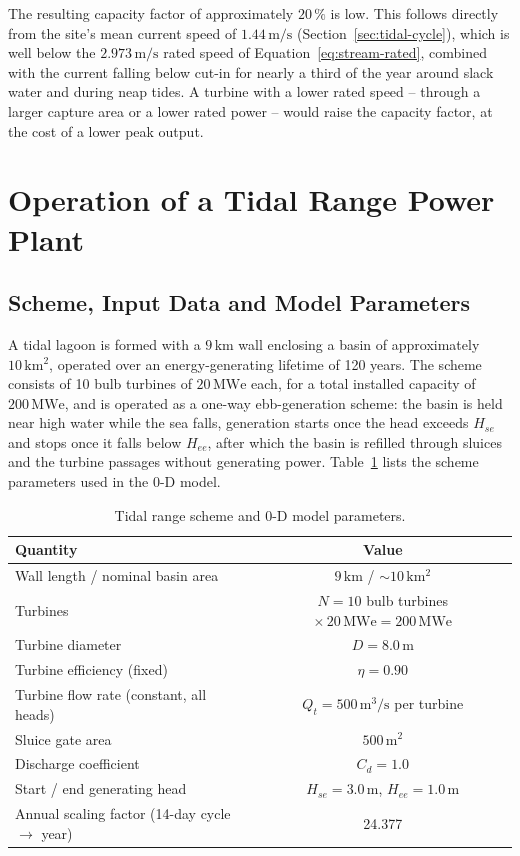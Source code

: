 The resulting capacity factor of approximately $20\,\%$ is low. This follows directly from the site's mean current speed of $1.44\,\mathrm{m/s}$ (Section~\ref{sec:tidal-cycle}), which is well below the $2.973\,\mathrm{m/s}$ rated speed of Equation~\eqref{eq:stream-rated}, combined with the current falling below cut-in for nearly a third of the year around slack water and during neap tides. A turbine with a lower rated speed -- through a larger capture area or a lower rated power -- would raise the capacity factor, at the cost of a lower peak output.

\section{Operation of a Tidal Range Power Plant}
\label{sec:tidal-range}

\subsection{Scheme, Input Data and Model Parameters}
\label{sec:range-inputs}
A tidal lagoon is formed with a $9\,\mathrm{km}$ wall enclosing a basin of approximately $10\,\mathrm{km^2}$, operated over an energy-generating lifetime of 120 years. The scheme consists of 10 bulb turbines of $20\,\mathrm{MWe}$ each, for a total installed capacity of $200\,\mathrm{MWe}$, and is operated as a one-way ebb-generation scheme: the basin is held near high water while the sea falls, generation starts once the head exceeds $H_{se}$ and stops once it falls below $H_{ee}$, after which the basin is refilled through sluices and the turbine passages without generating power. Table~\ref{tab:range-params} lists the scheme parameters used in the 0-D model.

\begin{table}[H]
    \centering
    \caption{Tidal range scheme and 0-D model parameters.}
    \label{tab:range-params}
    \begin{tabular}{lc}
        \hline
        Quantity & Value \\
        \hline
        Wall length / nominal basin area & $9\,\mathrm{km}$ / $\sim 10\,\mathrm{km^2}$ \\
        Turbines & $N=10$ bulb turbines $\times\, 20\,\mathrm{MWe} = 200\,\mathrm{MWe}$ \\
        Turbine diameter & $D = 8.0\,\mathrm{m}$ \\
        Turbine efficiency (fixed) & $\eta = 0.90$ \\
        Turbine flow rate (constant, all heads) & $Q_t = 500\,\mathrm{m^3/s}$ per turbine \\
        Sluice gate area & $500\,\mathrm{m^2}$ \\
        Discharge coefficient & $C_d = 1.0$ \\
        Start / end generating head & $H_{se}=3.0\,\mathrm{m}$, $H_{ee}=1.0\,\mathrm{m}$ \\
        Annual scaling factor (14-day cycle $\rightarrow$ year) & 24.377 \\
        \hline
    \end{tabular}
\end{table}


